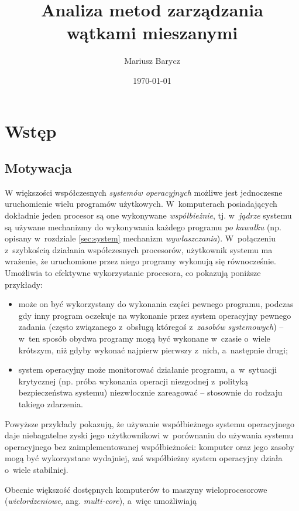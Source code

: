\documentclass[12pt]{mwart}
\author{Mariusz Barycz}
\title{Analiza metod zarządzania wątkami mieszanymi}
\date{\today}
\begin{document}
 


\maketitle
\thispagestyle{empty}

\newpage
\tableofcontents
\thispagestyle{empty}
\newpage

\section{Wstęp}
%
\subsection{Motywacja}
\label{sec:motivation}
\indent
  W większości współczesnych \emph{systemów operacyjnych} możliwe jest jednoczesne uruchomienie wielu
  programów użytkowych. W~komputerach posiadających dokładnie jeden procesor są one wykonywane \emph{współbieżnie}, tj. w~\emph{jądrze} systemu są używane mechanizmy do
  wykonywania każdego programu \emph{po kawałku} (np. opisany w~rozdziale \ref{sec:system} mechanizm \emph{wywłaszczania}). W~połączeniu
  z~szybkością działania współczesnych procesorów, użytkownik systemu ma wrażenie, że uruchomione przez niego programy wykonują się równocześnie.
  Umożliwia to efektywne wykorzystanie procesora, co pokazują poniższe przykłady:
  \begin{itemize}
    \item może on być wykorzystany do wykonania części pewnego programu,
      podczas gdy inny program oczekuje na wykonanie przez system operacyjny pewnego zadania (często związanego z~obsługą któregoś z~\emph{zasobów systemowych}) --
      w~ten sposób obydwa programy mogą być wykonane w~czasie o~wiele krótszym, niż gdyby wykonać najpierw pierwszy z~nich, a~następnie drugi;
    \item system operacyjny może monitorować działanie programu, a~w~sytuacji krytycznej (np. próba wykonania operacji niezgodnej z~polityką bezpieczeństwa systemu)
      niezwłocznie zareagować -- stosownie do rodzaju takiego zdarzenia.
  \end{itemize}
  Powyższe przykłady pokazują, że używanie współbieżnego systemu operacyjnego daje niebagatelne zyski jego użytkownikowi w~porównaniu do używania systemu operacyjnego
  bez zaimplementowanej współbieżności: komputer oraz jego zasoby mogą być wykorzystane wydajniej, zaś współbieżny system operacyjny działa o~wiele stabilniej.
\par
\indent
  Obecnie większość dostępnych komputerów to maszyny wieloprocesorowe (\emph{wielordzeniowe}, ang. \emph{multi-core}), a~więc umożliwiają
\end{document}
